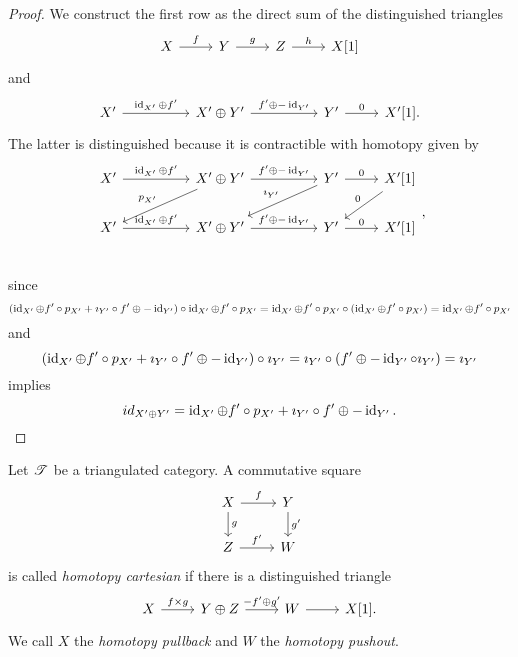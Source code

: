 \documentclass[dissertation.tex]{subfiles}
\begin{document}
\begin{prop}
\begin{proof}
  We construct the first row as the direct sum of the distinguished triangles
  $$\begin{tikzcd}
    X \arrow{r}{f} & Y \arrow{r}{g} & Z \arrow{r}{h} & X[1]
  \end{tikzcd}$$
  and
  $$\begin{tikzcd}
    X^\prime \arrow{rr}{\id_{X^\prime} \oplus f^\prime} & &
    X^\prime \oplus Y^\prime \arrow{rr}{f^\prime \oplus -\id_{Y^\prime}} & &
    Y^\prime \arrow{r}{0} & 
    X^\prime[1].
  \end{tikzcd}$$
  The latter is distinguished because it is contractible with homotopy given by
  $$\begin{tikzcd}
    X^\prime \arrow{rr}{\id_{X^\prime} \oplus f^\prime} & &
    X^\prime \oplus Y^\prime \arrow{rr}{f^\prime \oplus -\id_{Y^\prime}}\arrow[swap]{lld}{p_{X^\prime}} & &
    Y^\prime \arrow{r}{0}\arrow[swap]{lld}{\imath_{Y^\prime}} &
    X^\prime[1] \arrow[swap]{ld}{0}\\
    X^\prime \arrow{rr}{\id_{X^\prime} \oplus f^\prime} & &
    X^\prime \oplus Y^\prime \arrow{rr}{f^\prime \oplus -\id_{Y^\prime}} & &
    Y^\prime \arrow{r}{0} & 
    X^\prime[1]\\
  \end{tikzcd},$$
  since 
  $$(\operatorname{id}_{X^\prime} \oplus f^\prime \circ p_{X^\prime} + \imath_{Y^\prime} \circ f^\prime \oplus -\operatorname{id}_{Y^\prime}) \circ \operatorname{id}_{X^\prime} \oplus f^\prime \circ p_{X^\prime} 
  = \operatorname{id}_{X^\prime} \oplus f^\prime \circ p_{X^\prime} \circ (\operatorname{id}_{X^\prime} \oplus f^\prime \circ p_{X^\prime}) 
  = \operatorname{id}_{X^\prime} \oplus f^\prime \circ p_{X^\prime}$$
  and
  $$(\operatorname{id}_{X^\prime} \oplus f^\prime \circ p_{X^\prime} + \imath_{Y^\prime} \circ f^\prime \oplus -\operatorname{id}_{Y^\prime}) \circ \imath_{Y^\prime}
  = \imath_{Y^\prime} \circ (f^\prime \oplus -\operatorname{id}_{Y^\prime} \circ \imath_{Y^\prime})
  = \imath_{Y^\prime}$$
  implies
  $$id_{X^\prime \oplus Y^\prime} = \operatorname{id}_{X^\prime} \oplus f^\prime \circ p_{X^\prime} + \imath_{Y^\prime} \circ f^\prime \oplus -\operatorname{id}_{Y^\prime}.$$
\end{proof}
\end{prop}

\begin{defn}
  Let $\mathscr{T}$ be a triangulated category.
  A commutative square
  $$\begin{tikzcd}
    X \arrow{r}{f}\arrow{d}{g} & Y\arrow{d}{g^\prime}\\
    Z \arrow{r}{f^\prime} & W
  \end{tikzcd}$$
  is called {\it homotopy cartesian} if there is a distinguished triangle
  $$\begin{tikzcd}
    X \arrow{r}{f \times g} & Y \oplus Z \arrow{r}{-f^\prime \oplus g^\prime} & W \arrow{r} & X[1].
  \end{tikzcd}$$
  We call $X$ the {\it homotopy pullback} and $W$ the {\it homotopy pushout}.
\end{defn}
\end{document}
